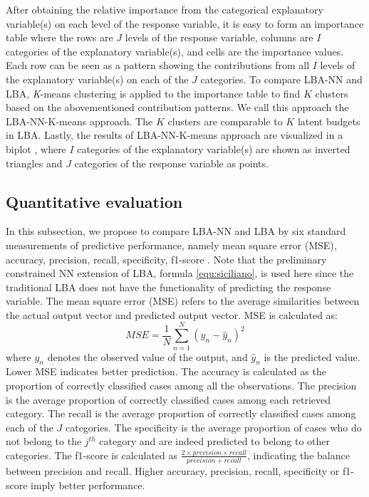 \documentclass[]{interact}
\theoremstyle{plain}%
\theoremstyle{definition}
\theoremstyle{remark}
\begin{document}
After obtaining the relative importance from the categorical explanatory
variable(s) on each level of the response variable, it is easy to form
an importance table where the rows are \(J\) levels of the response
variable, columns are \(I\) categories of the explanatory variable(s),
and cells are the importance values. Each row can be seen as a pattern
showing the contributions from all \(I\) levels of the explanatory
variable(s) on each of the \(J\) categories. To compare LBA-NN and LBA,
\emph{K}-means clustering \citep{hartigan1979} is applied to the
importance table to find \(K\) clusters based on the abovementioned
contribution patterns. We call this approach the LBA-NN-K-means
approach. The \(K\) clusters are comparable to \(K\) latent budgets in
LBA. Lastly, the results of LBA-NN-K-means approach are visualized in a
biplot \citep{gabriel1971}, where \(I\) categories of the explanatory
variable(s) are shown as inverted triangles and \(J\) categories of the
response variable as points.

\hypertarget{subsection:quanti}{%
\subsection{Quantitative evaluation}\label{subsection:quanti}}

In this subsection, we propose to compare LBA-NN and LBA by six standard
measurements of predictive performance, namely mean square error (MSE),
accuracy, precision, recall, specificity, f1-score \citep{lever2016}.
Note that the preliminary constrained NN extension of LBA, formula
\ref{equ:siciliano}, is used here since the traditional LBA does not
have the functionality of predicting the response variable. The mean
square error (MSE) refers to the average similarities between the actual
output vector and predicted output vector. MSE is calculated as:
\begin{equation}
  MSE = \frac{1}{N}\sum_{n=1}^N{(y_n - \hat{y}_n)^2} \tag{5}
\end{equation} where \(y_n\) denotes the observed value of the output,
and \(\hat{y}_n\) is the predicted value. Lower MSE indicates better
prediction. The accuracy is calculated as the proportion of correctly
classified cases among all the observations. The precision is the
average proportion of correctly classified cases among each retrieved
category. The recall is the average proportion of correctly classified
cases among each of the \(J\) categories. The specificity is the average
proportion of cases who do not belong to the \(j^{th}\) category and are
indeed predicted to belong to other categories. The f1-score is
calculated as
\(\frac{2\times precision \times recall}{precision + recall}\),
indicating the balance between precision and recall. Higher accuracy,
precision, recall, specificity or f1-score imply better performance.
\end{document}
